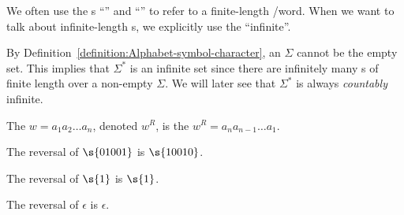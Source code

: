 \begin{note} \label{note:Finite-vs-infinite-strings}
We often use the s ``'' and ``'' to refer to a finite-length /word. 
When we want to talk about infinite-length s, we explicitly use the  ``infinite''.
\end{note}


\begin{note} \label{note:Size-of-Sigma}
By Definition~\ref{definition:Alphabet-symbol-character}, an  $\Sigma$ cannot be the empty set. 
This implies that $\Sigma^*$ is an infinite set since there are infinitely many s of finite length over a non-empty $\Sigma$. We will later see that $\Sigma^*$ is always \emph{countably} infinite.
\end{note}


\begin{flex}
\begin{definition} \label{definition:Reversal-of-a-string}
The  $w = a_1a_2\ldots a_n$, denoted $w^R$, is the  $w^R = a_na_{n-1}\ldots a_1$.
\end{definition}

\begin{example}[Reversal of $01001$] \label{example:Reversal-of-01001}
The reversal of $\s{01001}$ is $\s{10010}$.
\end{example}

\begin{example}[Reversal of $1$] \label{example:Reversal-of-1}
The reversal of $\s{1}$ is $\s{1}$.
\end{example}

\begin{example} \label{example:Reversal-of-epsilon}
The reversal of $\epsilon$ is $\epsilon$.
\end{example}
\end{flex}


